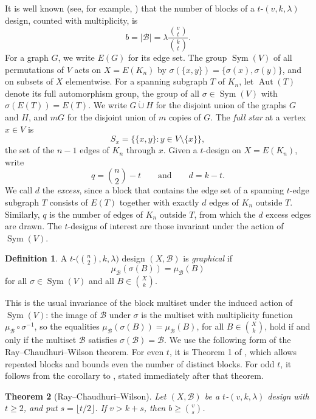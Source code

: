 \documentclass[12pt]{amsart}
\newtheorem{theorem}{Theorem}[section]
\theoremstyle{definition}
\newtheorem{definition}[theorem]{Definition}
\DeclareMathOperator{\Sym}{Sym}
\DeclareMathOperator{\Aut}{Aut}
\newcommand{\dcup}{\mathbin{\dot\cup}}
\newcommand{\cB}{\mathcal{B}}
\begin{document}
It is well known (see, for example, \cite{BJL1999}) that the number of
blocks of a $t$-$(v, k, \lambda)$ design, counted with multiplicity, is
\begin{equation}
\label{eq:blocks}
b = |\cB| = \lambda \frac{\binom{v}{t}}{\binom{k}{t}}.
\end{equation}
For a graph $G$, we write $E(G)$ for its edge set. The group $\Sym(V)$ of
all permutations of $V$ acts on $X = E(K_n)$ by $\sigma(\{x, y\}) =
\{\sigma(x), \sigma(y)\}$, and on subsets of $X$ elementwise. For a spanning
subgraph $T$ of $K_n$, let $\Aut(T)$ denote its full automorphism group, the
group of all $\sigma \in \Sym(V)$ with $\sigma(E(T)) = E(T)$. We write $G
\dcup H$ for the disjoint union of the graphs $G$ and $H$, and $mG$ for the
disjoint union of $m$ copies of $G$. The \emph{full star} at a vertex $x \in
V$ is
\[
S_x = \bigl\{ \{x, y\} : y \in V \setminus \{x\} \bigr\},
\]
the set of the $n - 1$ edges of $K_n$ through $x$. Given a $t$-design on $X
= E(K_n)$, write
\[
q = \binom{n}{2} - t \qquad \text{and} \qquad d = k - t.
\]
We call $d$ the \emph{excess}, since a block that contains the edge set of a
spanning $t$-edge subgraph $T$ consists of $E(T)$ together with exactly $d$
edges of $K_n$ outside $T$. Similarly, $q$ is the number of edges of $K_n$
outside $T$, from which the $d$ excess edges are drawn. The $t$-designs of
interest are those invariant under the action of $\Sym(V)$.

\begin{definition}
\label{def:graphical}
A $t$-$\bigl(\binom{n}{2}, k, \lambda\bigr)$ design $(X, \cB)$ is
\emph{graphical} if
\[
\mu_{\cB}(\sigma(B)) = \mu_{\cB}(B)
\]
for all $\sigma \in \Sym(V)$ and all $B \in \binom{X}{k}$.
\end{definition}

This is the usual invariance of the block multiset under the induced action
of $\Sym(V)$: the image of $\cB$ under $\sigma$ is the multiset with
multiplicity function $\mu_{\cB} \circ \sigma^{-1}$, so the equalities
$\mu_{\cB}(\sigma(B)) = \mu_{\cB}(B)$, for all $B \in \binom{X}{k}$, hold if
and only if the multiset $\cB$ satisfies $\sigma(\cB) = \cB$. We use the
following form of the Ray--Chaudhuri--Wilson theorem. For even $t$, it is
Theorem 1 of \cite{RCW1975}, which allows repeated blocks and bounds even
the number of distinct blocks. For odd $t$, it follows from the corollary to
\cite[Theorem 1]{RCW1975}, stated immediately after that theorem.

\begin{theorem}[Ray--Chaudhuri--Wilson]
\label{thm:rcw}
Let $(X, \cB)$ be a $t$-$(v, k, \lambda)$ design with $t \geq 2$, and put $s
= \lfloor t/2 \rfloor$. If $v > k + s$, then $b \geq \binom{v}{s}$.
\end{theorem}
\end{document}
